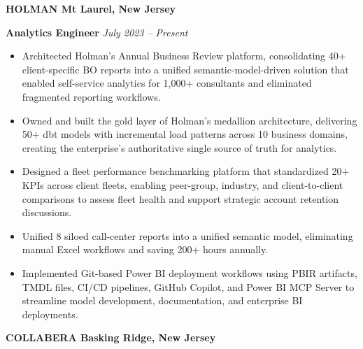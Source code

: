 \documentclass[10pt]{article}
\begin{document}
\noindent\textbf{HOLMAN \hfill Mt Laurel, New Jersey}

\noindent \textbf{Analytics Engineer} \hfill \textit{July 2023 -- Present}
\begin{itemize}[leftmargin=*, label={•}]

\vspace{0.1cm}

\item Architected Holman's Annual Business Review platform, consolidating 40+ client-specific BO reports into a unified semantic-model-driven solution that enabled self-service analytics for 1,000+ consultants and eliminated fragmented reporting workflows.

\vspace{0.1cm}

\item Owned and built the gold layer of Holman's medallion architecture, delivering 50+ dbt models with incremental load patterns across 10 business domains, creating the enterprise's authoritative single source of truth for analytics.

\vspace{0.1cm}

\item Designed a fleet performance benchmarking platform that standardized 20+ KPIs across client fleets, enabling peer-group, industry, and client-to-client comparisons to assess fleet health and support strategic account retention discussions.

\vspace{0.1cm}

\item Unified 8 siloed call-center reports into a unified semantic model, eliminating manual Excel workflows and saving 200+ hours annually.

\vspace{0.1cm}

\item Implemented Git-based Power BI deployment workflows using PBIR artifacts, TMDL files, CI/CD pipelines, GitHub Copilot, and Power BI MCP Server to streamline model development, documentation, and enterprise BI deployments.


\end{itemize}
\vspace{0.4cm}

\noindent\textbf{COLLABERA \hfill Basking Ridge, New Jersey}
\end{document}
